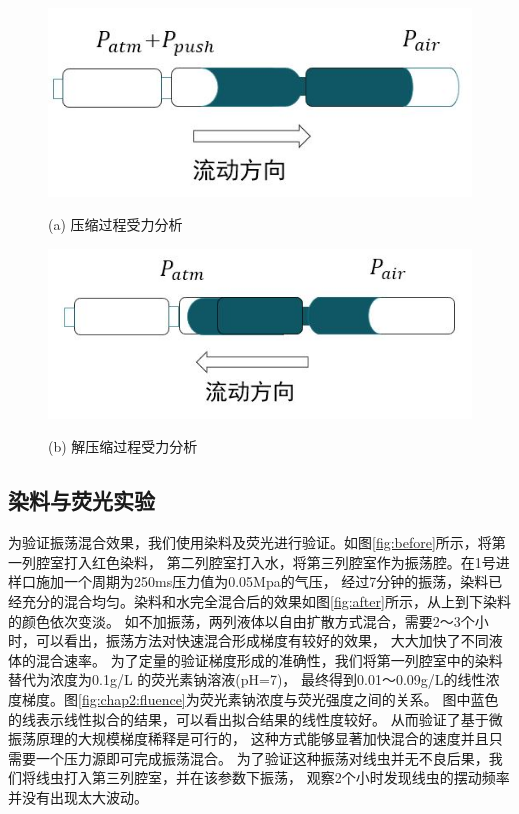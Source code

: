 	\begin{figure}[!htp]    
	\begin{minipage}[t]{0.5\linewidth}%
		\centering    
		\includegraphics[width=1\linewidth]{figure/chap2/force2.jpg}    
		\caption*{(a) 压缩过程受力分析}%
		\label{fig:compress}    
	\end{minipage}    
	\begin{minipage}[t]{0.5\linewidth}%
		\centering    
		\includegraphics[width=1\linewidth]{figure/chap2/force1.jpg}    
		\caption*{(b) 解压缩过程受力分析}
		\label{fig:decompress}
	\end{minipage}
	\label{fig:force}
	\end{figure}
	
\subsection{染料与荧光实验}
为验证振荡混合效果，我们使用染料及荧光进行验证。如图\ref{fig:before}所示，将第一列腔室打入红色染料，
第二列腔室打入水，将第三列腔室作为振荡腔。在1号进样口施加一个周期为250ms压力值为0.05Mpa的气压，
经过7分钟的振荡，染料已经充分的混合均匀。染料和水完全混合后的效果如图\ref{fig:after}所示，从上到下染料的颜色依次变淡。
如不加振荡，两列液体以自由扩散方式混合，需要2～3个小时，可以看出，振荡方法对快速混合形成梯度有较好的效果，
大大加快了不同液体的混合速率。
为了定量的验证梯度形成的准确性，我们将第一列腔室中的染料替代为浓度为0.1g/L 的荧光素钠溶液(pH=7)，
最终得到0.01～0.09g/L的线性浓度梯度。图\ref{fig:chap2:fluence}为荧光素钠浓度与荧光强度之间的关系。
图中蓝色的线表示线性拟合的结果，可以看出拟合结果的线性度较好。
从而验证了基于微振荡原理的大规模梯度稀释是可行的，
这种方式能够显著加快混合的速度并且只需要一个压力源即可完成振荡混合。
为了验证这种振荡对线虫并无不良后果，我们将线虫打入第三列腔室，并在该参数下振荡，
观察2个小时发现线虫的摆动频率并没有出现太大波动。

